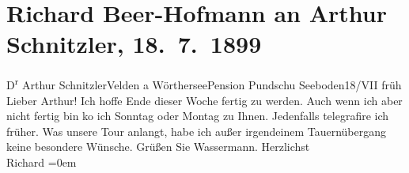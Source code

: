 

         
         \renewcommand{\erwaehntePersonen}{Personen: Richard Beer-Hofmann, Jakob Wassermann}
         \renewcommand{\erwaehnteOrte}{Orte: Hohe Tauern, Pension Pundschu, Seeboden, Velden am Wörthersee}
         \renewcommand{\erwaehnteWerke}{Werke: Der Tod Georgs}
               \section[Richard Beer-Hofmann an Arthur Schnitzler, 18. 7. 1899]{ Richard Beer-Hofmann an Arthur Schnitzler, 18. 7. 1899}\nopagebreak{}\rehead{ }\begin{ledgroupsized}[t]{13cm}\normalsize\beginnumbering \toendnotes[C]{\smallbreak\pagebreak[2]} 
\toendnotes[C]{\smallbreak}\pstart{}{\pb}D\textsuperscript{r}
                  Arthur Schnitzler\pend{}\pstart{}Velden a Wörthersee\pend{}\pstart{}Pension Pundschu\pend{}{\bigskip}\pstart
           \raggedleft{}{\pb}Seeboden18/VII früh\pend
           \pstart
           Lieber Arthur! Ich hoffe Ende dieser Woche fertig zu werden. Auch
               wenn ich aber nicht fertig bin
                  ko{\geminationm} ich Sonntag oder Montag
               zu Ihnen. Jedenfalls telegrafire ich früher.\pend
           \pstart
           Was unsere Tour anlangt, habe ich außer irgendeinem Tauernübergang keine besondere Wünsche.\pend
           \pstart
           Grüßen Sie Wassermann.\pend
           \pstart
           Herzlichst{\\[\baselineskip]}\spacefill\mbox{Richard}\pend
           \leftskip=0em{}
         
         \endnumbering{}\end{ledgroupsized}  \newcommand{\dateiname}{L00946}\newcommand{\titel}{Richard Beer-Hofmann an Arthur Schnitzler, 18. 7. 1899}\newcommand{\editorInnen}{Martin Anton Müller und Gerd-Hermann Susen}
      